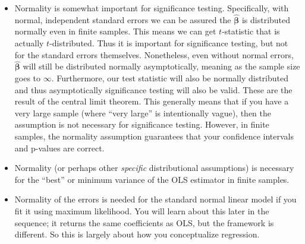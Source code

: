 \documentclass[]{article}
\providecommand{\tightlist}{%
  \setlength{\itemsep}{0pt}\setlength{\parskip}{0pt}}
\begin{document}
\begin{itemize}
\tightlist
\item
  Normality is somewhat important for significance testing.
  Specifically, with normal, independent standard errors we can be
  assured the \(\hat{\bm{\beta}}\) is distributed normally even in
  finite samples. This means we can get \(t\)-statistic that is actually
  \(t\)-distributed. Thus it is important for significance testing, but
  not for the standard errors themselves. Nonetheless, even without
  normal errors, \(\hat{\bm{\beta}}\) will still be distributed normally
  asymptotically, meaning as the sample size goes to \(\infty\).
  Furthermore, our test statistic will also be normally distributed and
  thus asymptotically significance testing will also be valid. These are
  the result of the central limit theorem. This generally means that if
  you have a very large sample (where ``very large'' is intentionally
  vague), then the assumption is not necessary for significance testing.
  However, in finite samples, the normality assumption guarantees that
  your confidence intervals and p-values are correct.
\item
  Normality (or perhaps other \emph{specific} distributional
  assumptions) is necessary for the ``best'' or minimum variance of the
  OLS estimator in finite samples.
\item
  Normality of the errors is needed for the standard normal linear model
  if you fit it using maximum likelihood. You will learn about this
  later in the sequence; it returns the same coefficients as OLS, but
  the framework is different. So this is largely about how you
  conceptualize regression.
\end{itemize}
\end{document}
